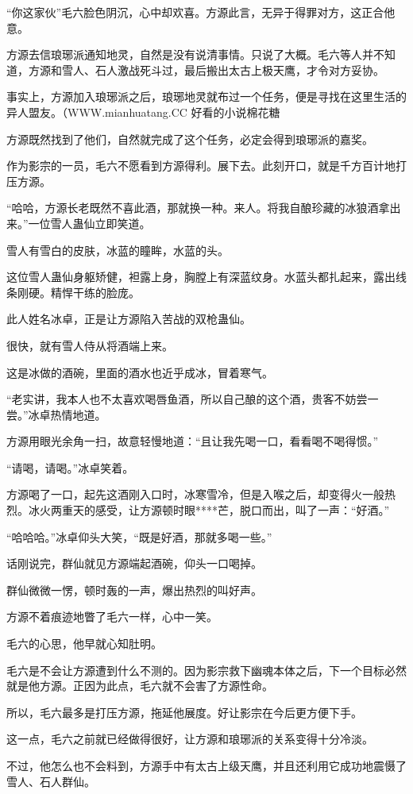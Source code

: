 \begin{this_body}
“你这家伙”毛六脸色阴沉，心中却欢喜。方源此言，无异于得罪对方，这正合他意。

方源去信琅琊派通知地灵，自然是没有说清事情。只说了大概。毛六等人并不知道，方源和雪人、石人激战死斗过，最后搬出太古上极天鹰，才令对方妥协。

事实上，方源加入琅琊派之后，琅琊地灵就布过一个任务，便是寻找在这里生活的异人盟友。（WWW.mianhuatang.CC 好看的小说棉花糖

方源既然找到了他们，自然就完成了这个任务，必定会得到琅琊派的嘉奖。

作为影宗的一员，毛六不愿看到方源得利。展下去。此刻开口，就是千方百计地打压方源。

“哈哈，方源长老既然不喜此酒，那就换一种。来人。将我自酿珍藏的冰狼酒拿出来。”一位雪人蛊仙立即笑道。

雪人有雪白的皮肤，冰蓝的瞳眸，水蓝的头。

这位雪人蛊仙身躯矫健，袒露上身，胸膛上有深蓝纹身。水蓝头都扎起来，露出线条刚硬。精悍干练的脸庞。

此人姓名冰卓，正是让方源陷入苦战的双枪蛊仙。

很快，就有雪人侍从将酒端上来。

这是冰做的酒碗，里面的酒水也近乎成冰，冒着寒气。

“老实讲，我本人也不太喜欢喝唇鱼酒，所以自己酿的这个酒，贵客不妨尝一尝。”冰卓热情地道。

方源用眼光余角一扫，故意轻慢地道：“且让我先喝一口，看看喝不喝得惯。”

“请喝，请喝。”冰卓笑着。

方源喝了一口，起先这酒刚入口时，冰寒雪冷，但是入喉之后，却变得火一般热烈。冰火两重天的感受，让方源顿时眼****芒，脱口而出，叫了一声：“好酒。”

“哈哈哈。”冰卓仰头大笑，“既是好酒，那就多喝一些。”

话刚说完，群仙就见方源端起酒碗，仰头一口喝掉。

群仙微微一愣，顿时轰的一声，爆出热烈的叫好声。

方源不着痕迹地瞥了毛六一样，心中一笑。

毛六的心思，他早就心知肚明。

毛六是不会让方源遭到什么不测的。因为影宗救下幽魂本体之后，下一个目标必然就是他方源。正因为此点，毛六就不会害了方源性命。

所以，毛六最多是打压方源，拖延他展度。好让影宗在今后更方便下手。

这一点，毛六之前就已经做得很好，让方源和琅琊派的关系变得十分冷淡。

不过，他怎么也不会料到，方源手中有太古上级天鹰，并且还利用它成功地震慑了雪人、石人群仙。


\end{this_body}
